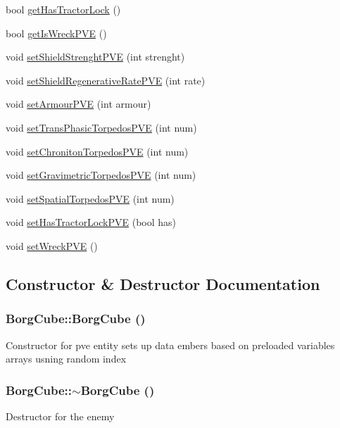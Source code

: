 \begin{DoxyCompactItemize}
\item 
bool \hyperlink{classBorgCube_a9090916676b96c967245603216470be6}{getHasTractorLock} ()
\item 
bool \hyperlink{classBorgCube_ad1da81322c189f42505e3ee135be7289}{getIsWreckPVE} ()
\item 
void \hyperlink{classBorgCube_a4590ecc3b6fa8c5f4051a7d1f58c81a2}{setShieldStrenghtPVE} (int strenght)
\item 
void \hyperlink{classBorgCube_ac7dd191ef58188f716cce88130225e19}{setShieldRegenerativeRatePVE} (int rate)
\item 
void \hyperlink{classBorgCube_acf52ecf22eced30bb13babcf67834c6a}{setArmourPVE} (int armour)
\item 
void \hyperlink{classBorgCube_a57d56e4d39de504354dd318a23f7dab7}{setTransPhasicTorpedosPVE} (int num)
\item 
void \hyperlink{classBorgCube_a1a4a73eb1b38f0d8b79445d8e4be691f}{setChronitonTorpedosPVE} (int num)
\item 
void \hyperlink{classBorgCube_a58c2c36486db382f82ab33fcd3c16937}{setGravimetricTorpedosPVE} (int num)
\item 
void \hyperlink{classBorgCube_a98ae970219c8449220e3fac00456775d}{setSpatialTorpedosPVE} (int num)
\item 
void \hyperlink{classBorgCube_ada98eeae90c300a04e787209bb8611df}{setHasTractorLockPVE} (bool has)
\item 
void \hyperlink{classBorgCube_ad764e3b9b70804c7cb2f292628fcf7fd}{setWreckPVE} ()
\end{DoxyCompactItemize}


\subsection{Constructor \& Destructor Documentation}
\hypertarget{classBorgCube_a55a4e4bb838f002a5d83e99519ad22df}{
\subsubsection[{BorgCube}]{\setlength{\rightskip}{0pt plus 5cm}BorgCube::BorgCube ()}}
\label{d2/d93/classBorgCube_a55a4e4bb838f002a5d83e99519ad22df}
Constructor for pve entity sets up data embers based on preloaded variables arrays usning random index \hypertarget{classBorgCube_ac714320be9e02beb96853f7143a71486}{
\subsubsection[{$\sim$BorgCube}]{\setlength{\rightskip}{0pt plus 5cm}BorgCube::$\sim$BorgCube ()}}
\label{d2/d93/classBorgCube_ac714320be9e02beb96853f7143a71486}
Destructor for the enemy 

